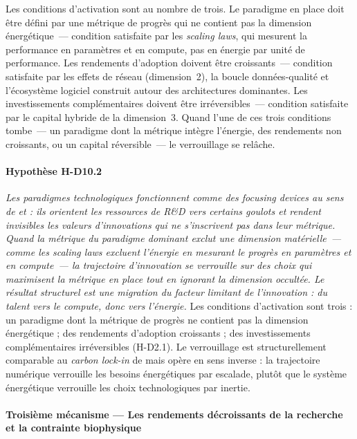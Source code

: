 Les conditions d'activation sont au nombre de trois. Le paradigme en place doit être défini par une métrique de progrès qui ne contient pas la dimension énergétique~--- condition satisfaite par les \emph{scaling laws}, qui mesurent la performance en paramètres et en compute, pas en énergie par unité de performance. Les rendements d'adoption doivent être croissants~--- condition satisfaite par les effets de réseau (dimension~2), la boucle données-qualité et l'écosystème logiciel construit autour des architectures dominantes. Les investissements complémentaires doivent être irréversibles~--- condition satisfaite par le capital hybride de la dimension~3. Quand l'une de ces trois conditions tombe~--- un paradigme dont la métrique intègre l'énergie, des rendements non croissants, ou un capital réversible~--- le verrouillage se relâche.


\paragraph{Hypothèse H-D10.2} \emph{Les paradigmes technologiques fonctionnent comme des \emph{focusing devices} au sens de \textcite{dosi_technological_1982} et \textcite{rosenberg_factors_1969} : ils orientent les ressources de R\&D vers certains goulots et rendent invisibles les valeurs d'innovations qui ne s'inscrivent pas dans leur métrique. Quand la métrique du paradigme dominant exclut une dimension matérielle~--- comme les \emph{scaling laws} \parencite{kaplan_scaling_2020} excluent l'énergie en mesurant le progrès en paramètres et en \emph{compute}~--- la trajectoire d'innovation se verrouille sur des choix qui maximisent la métrique en place tout en ignorant la dimension occultée. Le résultat structurel est une migration du facteur limitant de l'innovation : du talent vers le compute, donc vers l'énergie.} Les conditions d'activation sont trois : un paradigme dont la métrique de progrès ne contient pas la dimension énergétique ; des rendements d'adoption croissants ; des investissements complémentaires irréversibles (H-D2.1). Le verrouillage est structurellement comparable au \emph{carbon lock-in} de \textcite{unruh_understanding_2000} mais opère en sens inverse : la trajectoire numérique verrouille les besoins énergétiques par escalade, plutôt que le système énergétique verrouille les choix technologiques par inertie.

\paragraph{Troisième mécanisme --- Les rendements décroissants de la recherche et la contrainte biophysique}

